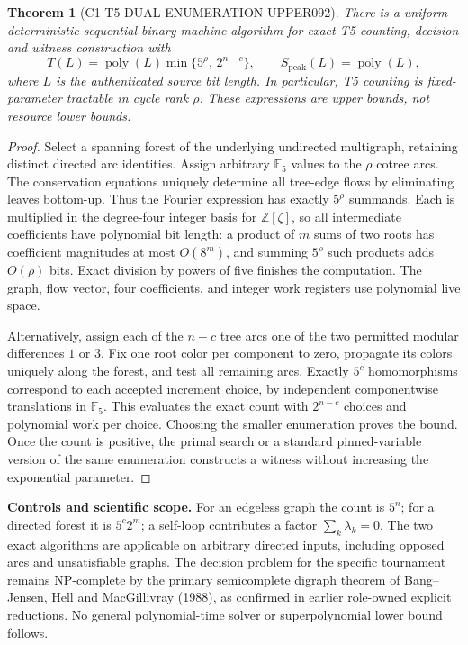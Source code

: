 \documentclass[11pt]{article}
\newtheorem{theorem}{Theorem}
\begin{document}
\begin{theorem}[C1-T5-DUAL-ENUMERATION-UPPER092]
There is a uniform deterministic sequential binary-machine algorithm
for exact T5 counting, decision and witness construction with
\[
T(L)=\operatorname{poly}(L)\min\{5^{\rho},\,2^{n-c}\},
\qquad
S_{\mathrm{peak}}(L)=\operatorname{poly}(L),
\]
where $L$ is the authenticated source bit length. In particular,
T5 counting is fixed-parameter tractable in cycle rank $\rho$.
These expressions are upper bounds, not resource lower bounds.
\end{theorem}
\begin{proof}
Select a spanning forest of the underlying undirected multigraph,
retaining distinct directed arc identities. Assign arbitrary
$\mathbb F_5$ values to the $\rho$ cotree arcs. The conservation
equations uniquely determine all tree-edge flows by eliminating leaves
bottom-up. Thus the Fourier expression has exactly $5^\rho$ summands.
Each is multiplied in the degree-four integer basis for $\mathbb Z[\zeta]$,
so all intermediate coefficients have polynomial bit length: a product
of $m$ sums of two roots has coefficient magnitudes at most
$O(8^m)$, and summing $5^\rho$ such products adds $O(\rho)$ bits.
Exact division by powers of five finishes the computation. The graph,
flow vector, four coefficients, and integer work registers use
polynomial live space.

Alternatively, assign each of the $n-c$ tree arcs one of the two
permitted modular differences $1$ or $3$. Fix one root color per
component to zero, propagate its colors uniquely along the forest,
and test all remaining arcs. Exactly $5^c$ homomorphisms correspond
to each accepted increment choice, by independent componentwise
translations in $\mathbb F_5$. This evaluates the exact count with
$2^{n-c}$ choices and polynomial work per choice. Choosing the smaller
enumeration proves the bound. Once the count is positive, the primal
search or a standard pinned-variable version of the same enumeration
constructs a witness without increasing the exponential parameter.
\end{proof}

\noindent\textbf{Controls and scientific scope.} For an edgeless graph
the count is $5^n$; for a directed forest it is $5^c2^m$; a
self-loop contributes a factor $\sum_k\lambda_k=0$. The two exact
algorithms are applicable on arbitrary directed inputs, including
opposed arcs and unsatisfiable graphs. The decision problem for the
specific tournament remains NP-complete by the primary semicomplete
digraph theorem of Bang--Jensen, Hell and MacGillivray (1988), as
confirmed in earlier role-owned explicit reductions. No general
polynomial-time solver or superpolynomial lower bound follows.
\end{document}
